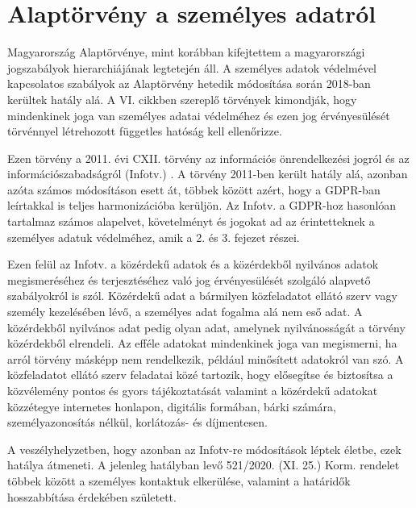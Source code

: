 \section{Alaptörvény a személyes adatról}

Magyarország Alaptörvénye, mint korábban kifejtettem a magyarországi jogszabályok hierarchiájának legtetején áll. A személyes adatok védelmével kapcsolatos szabályok az Alaptörvény hetedik módosítása során 2018-ban kerültek hatály alá. A VI. cikkben szereplő törvények kimondják, hogy mindenkinek joga van személyes adatai védelméhez és ezen jog érvényesülését törvénnyel létrehozott függetles hatóság kell ellenőrizze. \cite{alaptorveny}

Ezen törvény a 2011. évi CXII. törvény az információs önrendelkezési jogról és az információszabadságról (Infotv.) \cite{2011-CXII-torveny}. A törvény 2011-ben került hatály alá, azonban azóta számos módosításon esett át, többek között azért, hogy a GDPR-ban leírtakkal is teljes harmonizációba kerüljön. Az Infotv. a GDPR-hoz hasonlóan tartalmaz számos alapelvet, követelményt és jogokat ad az érintetteknek a személyes adatuk védelméhez, amik a 2. és 3. fejezet részei.

Ezen felül az Infotv. a közérdekű adatok és a közérdekből nyilvános adatok megismeréséhez és terjesztéséhez való jog érvényesülését szolgáló alapvető szabályokról is szól. Közérdekű adat a bármilyen közfeladatot ellátó szerv vagy személy kezelésében lévő, a személyes adat fogalma alá nem eső adat. A közérdekből nyilvános adat pedig olyan adat, amelynek nyilvánosságát a törvény közérdekből elrendeli. Az efféle adatokat mindenkinek joga van megismerni, ha arról törvény másképp nem rendelkezik, például minősített adatokról van szó. A közfeladatot ellátó szerv feladatai közé tartozik, hogy elősegítse és biztosítsa a közvélemény pontos és gyors tájékoztatását valamint a közérdekű adatokat közzétegye internetes honlapon, digitális formában, bárki számára, személyazonosítás nélkül, korlátozás- és díjmentesen.

A veszélyhelyzetben, hogy azonban az Infotv-re módosítások léptek életbe, ezek hatálya átmeneti. \cite{521/2020} A jelenleg hatályban levő 521/2020. (XI. 25.) Korm. rendelet többek között a személyes kontaktuk elkerülése, valamint a határidők hosszabbítása érdekében született.